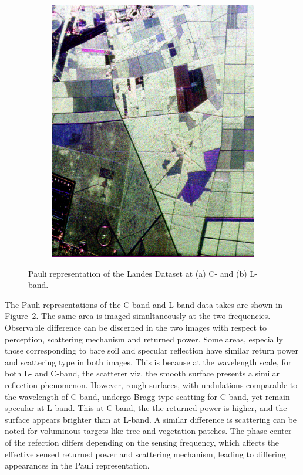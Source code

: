 \begin{figure}[tbp]
\begin{subfigure}[b]{0.4\textwidth}
		\includegraphics[width=\textwidth]{Figures/Extra/LandesKronL}
		\caption{}
		\label{fig:kronlandesl}
	\end{subfigure}
	\caption{Pauli representation of the Landes Dataset at (a) C- and (b) L- band.  }
	\label{fig:landes_kron_pauli}
\end{figure}

The Pauli representations of the C-band and L-band data-takes are shown in Figure~\ref{fig:landes_kron_pauli}. The same area is imaged simultaneously at the two frequencies. Observable difference can be discerned in the two images with respect to perception, scattering mechanism and returned power. Some areas, especially those corresponding to bare soil and specular reflection have similar return power and scattering type in both images. This is because at the wavelength scale, for both L- and C-band, the scatterer viz. the smooth surface presents a similar reflection phenomenon. However, rough surfaces, with undulations comparable to the wavelength of C-band, undergo Bragg-type scatting for C-band, yet remain specular at L-band. This at C-band, the the returned power is higher, and the surface appears brighter than at L-band. A similar difference is scattering can be noted for voluminous targets like tree and vegetation patches. The phase center of the refection differs depending on the sensing frequency, which affects the effective sensed returned power and scattering mechanism, leading to differing appearances in the Pauli representation. 

